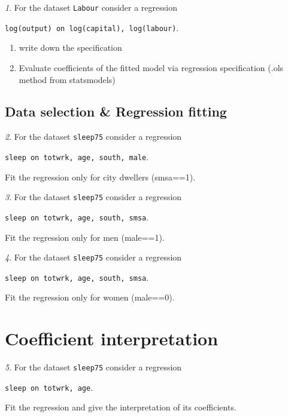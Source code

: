 \documentclass[12pt]{article}
\theoremstyle{remark}
\newtheorem{problem}{}[section]
\begin{document}
\begin{problem}
For the dataset \texttt{Labour} consider a regression
\begin{center}
\texttt{log(output) on log(capital), log(labour)}.
\end{center}
\begin{enumerate}
	\item write down the specification
	\item Evaluate coefficients of the fitted model via 
	regression specification (.ols method from statsmodels)
\end{enumerate}
\end{problem}

\subsection*{Data selection \& Regression fitting}

\begin{problem}
For the dataset \texttt{sleep75} consider a regression
\begin{center}
	\texttt{sleep on totwrk, age, south, male}.
\end{center}
Fit the regression only for city dwellers (smsa==1).
\end{problem}

\begin{problem}
For the dataset \texttt{sleep75} consider a regression
\begin{center}
	\texttt{sleep on totwrk, age, south, smsa}.
\end{center}
Fit the regression only for men (male==1).
\end{problem}

\begin{problem}
For the dataset \texttt{sleep75} consider a regression
\begin{center}
	\texttt{sleep on totwrk, age, south, smsa}.
\end{center}
Fit the regression only for women (male==0).
\end{problem}

\section{Coefficient interpretation}

\begin{problem}
For the dataset \texttt{sleep75} consider a regression
\begin{center}
\texttt{sleep on totwrk, age}.
\end{center}
Fit the regression and give the interpretation of its coefficients.
\end{problem}
\end{document}
